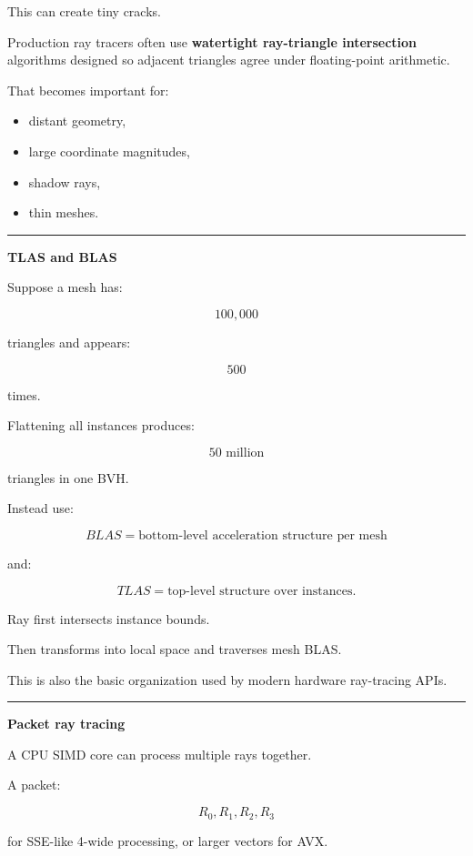 This can create tiny cracks.

Production ray tracers often use \textbf{watertight ray-triangle intersection} algorithms designed so adjacent triangles agree under floating-point arithmetic.

That becomes important for:

\begin{itemize}
\tightlist
\item
  distant geometry,
\item
  large coordinate magnitudes,
\item
  shadow rays,
\item
  thin meshes.
\end{itemize}

\begin{center}\rule{0.5\linewidth}{0.5pt}\end{center}

\textbf{TLAS and BLAS}

Suppose a mesh has:

\[
100,000
\]

triangles and appears:

\[
500
\]

times.

Flattening all instances produces:

\[
50\text{ million}
\]

triangles in one BVH.

Instead use:

\[
\boxed{
BLAS=\text{bottom-level acceleration structure per mesh}
}
\]

and:

\[
\boxed{
TLAS=\text{top-level structure over instances}.
}
\]

Ray first intersects instance bounds.

Then transforms into local space and traverses mesh BLAS.

This is also the basic organization used by modern hardware ray-tracing APIs.

\begin{center}\rule{0.5\linewidth}{0.5pt}\end{center}

\textbf{Packet ray tracing}

A CPU SIMD core can process multiple rays together.

A packet:

\[
R_0,R_1,R_2,R_3
\]

for SSE-like 4-wide processing, or larger vectors for AVX.


